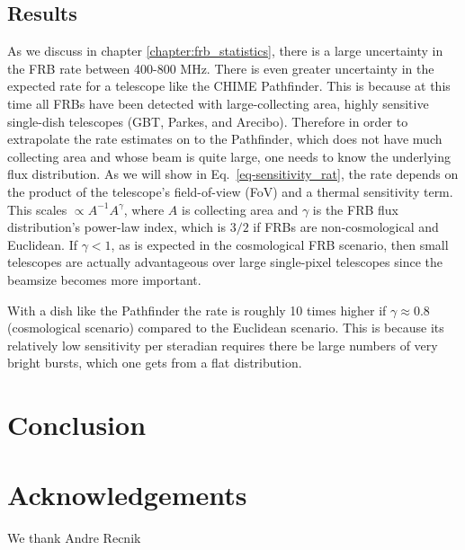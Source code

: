 \subsection{Results}
As we discuss in chapter \ref{chapter:frb_statistics}, there is 
a large uncertainty in the FRB rate between 400-800 MHz. There 
is even greater uncertainty in the expected rate for a 
telescope like the CHIME Pathfinder. This is because at this time all FRBs
have been detected with large-collecting area, highly sensitive single-dish 
telescopes (GBT, Parkes, and Arecibo). Therefore in order to 
extrapolate the rate estimates on to the Pathfinder, which 
does not have much collecting area and whose beam is quite large, one 
needs to know the underlying flux distribution. As we will show 
in Eq.~\ref{eq-sensitivity_rat}, the rate depends on the product 
of the telescope's field-of-view (FoV) and a thermal sensitivity term. 
This scales $\propto A^{-1} A^\gamma$, where $A$ is collecting area 
and $\gamma$ is the FRB flux distribution's power-law index, which is 
$3/2$ if FRBs are non-cosmological and Euclidean. If $\gamma < 1$, 
as is expected in the cosmological FRB scenario, then 
small telescopes are actually advantageous over large single-pixel telescopes 
since the beamsize becomes more important. 

With a dish like the Pathfinder
the rate is roughly 10 times higher if $\gamma\approx 0.8$ (cosmological scenario) 
compared to the Euclidean scenario. This is because its relatively 
low sensitivity per steradian requires there be large numbers 
of very bright bursts, which one gets from a flat distribution.


\section{Conclusion}
\label{sec:conclusion}
  


\section*{\centering Acknowledgements}

We thank Andre Recnik
  
